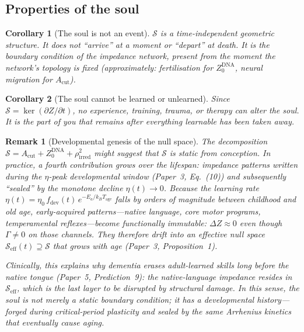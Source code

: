 \documentclass[aps,pre,twocolumn,superscriptaddress,floatfix]{revtex4-2}
\newtheorem{corollary}{Corollary}
\newtheorem{remark}{Remark}
\newcommand{\Acut}{A_{\text{cut}}}
\begin{document}
\subsection{Properties of the soul}

\begin{corollary}[The soul is not an event]
$\mathcal{S}$ is a time-independent geometric structure.
It does not ``arrive'' at a moment or ``depart'' at death.
It is the boundary condition of the impedance network,
present from the moment the network's topology is fixed
(approximately: fertilisation for $Z_0^{\text{DNA}}$,
neural migration for $\Acut$).
\end{corollary}

\begin{corollary}[The soul cannot be learned or unlearned]
Since $\mathcal{S}=\ker(\partial Z/\partial t)$, no
experience, training, trauma, or therapy can alter the soul.
It is the part of you that remains after everything learnable
has been taken away.
\end{corollary}

\begin{remark}[Developmental genesis of the null space]
\label{rem:null-developmental}
The decomposition $\mathcal{S} = \Acut + Z_0^{\text{DNA}}
+ \rho_{\text{irred}}^2$ might suggest that $\mathcal{S}$
is static from conception.
In practice, a fourth contribution grows over the lifespan:
impedance patterns written during the $\eta$-peak
developmental window (Paper~3, Eq.~(10)) and subsequently
``sealed'' by the monotone decline $\eta(t)\to 0$.
Because the learning rate $\eta(t) = \eta_0\,
f_{\text{dev}}(t)\,e^{-E_a/k_B T_{\text{age}}}$ falls by
orders of magnitude between childhood and old age,
early-acquired patterns---native language, core motor
programs, temperamental reflexes---become
\emph{functionally immutable}: $\Delta Z \approx 0$ even
though $\Gamma\neq 0$ on those channels.
They therefore drift into an \emph{effective null space}
$\mathcal{S}_{\text{eff}}(t) \supseteq \mathcal{S}$
that grows with age (Paper~3, Proposition~1).

Clinically, this explains why dementia erases
adult-learned skills long before the native tongue
(Paper~5, Prediction~9): the native-language impedance
resides in $\mathcal{S}_{\text{eff}}$, which is the last
layer to be disrupted by structural damage.
In this sense, the soul is not merely a static boundary
condition; it has a \emph{developmental history}---forged
during critical-period plasticity and sealed by the same
Arrhenius kinetics that eventually cause aging.
\end{remark}
\end{document}
